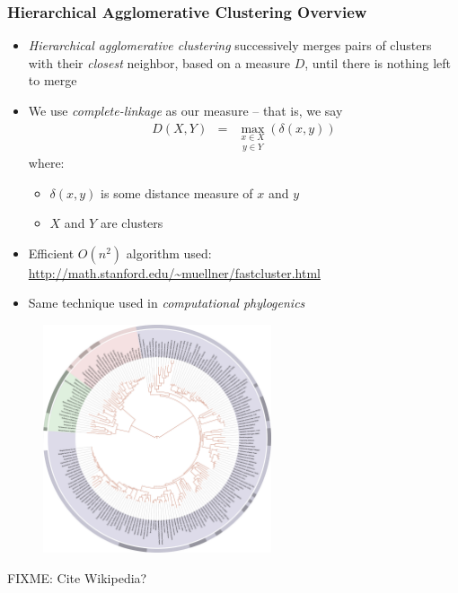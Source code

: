 \begin{frame}[allowframebreaks]
\frametitle{Hierarchical Agglomerative Clustering Overview}
\begin{itemize}
	\item \emph{Hierarchical agglomerative clustering} successively merges pairs of clusters with their \emph{closest} neighbor, based on a measure $D$, until there is nothing left to merge
	\item We use \emph{complete-linkage} as our measure -- that is, we say
\begin{eqnarray*}
  D (X, Y) & = & \underset{y \in Y}{\underset{x \in X}{\max}} (\delta (x, y))
\end{eqnarray*}
	where:
	\begin{itemize}
		\item $\delta(x,y)$ is some distance measure of $x$ and $y$
		\item $X$ and $Y$ are clusters
	\end{itemize}
	\item Efficient $O(n^2)$ algorithm used:
	\url{http://math.stanford.edu/~muellner/fastcluster.html}
\end{itemize}
\framebreak
\begin{itemize}
	\item Same technique used in \emph{computational phylogenics}
\end{itemize}
\begin{figure}[h,b]
\centering
\includegraphics[width=0.6\textwidth]{Tree-of-life-SVG}
\end{figure}
FIXME: Cite Wikipedia?
	

\end{frame}
